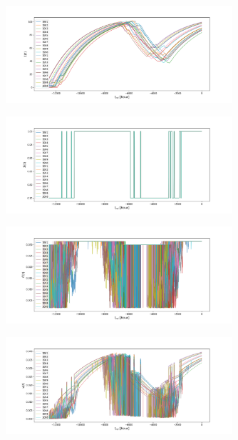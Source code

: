 \documentclass[11pt, a4paper]{article}
\begin{document}
\begin{figure}[h!]
    \centering
    \includegraphics[width=0.75\textwidth]{images/L_plot.png}
\end{figure}

\newpage
\begin{figure}[h!]
    \centering
    \includegraphics[width=0.75\textwidth]{images/S_plot.png}
\end{figure}
\begin{figure}[h!]
    \centering
    \includegraphics[width=0.75\textwidth]{images/C_plot.png}
\end{figure}
\begin{figure}[h!]
    \centering
    \includegraphics[width=0.75\textwidth]{images/nu_plot.png}
\end{figure}
\end{document}
